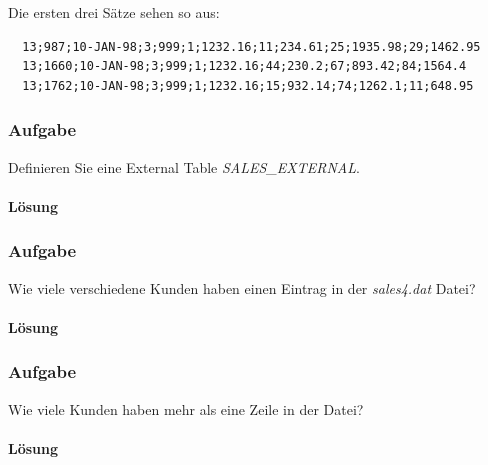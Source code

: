 Die ersten drei Sätze sehen so aus:
\begin{verbatim}
  13;987;10-JAN-98;3;999;1;1232.16;11;234.61;25;1935.98;29;1462.95
  13;1660;10-JAN-98;3;999;1;1232.16;44;230.2;67;893.42;84;1564.4
  13;1762;10-JAN-98;3;999;1;1232.16;15;932.14;74;1262.1;11;648.95
\end{verbatim}


\subsubsection{Aufgabe}
\label{subsec:uebung_12.aufgabe_01a}
Definieren Sie eine External Table \textit{SALES\_EXTERNAL}.

\paragraph{Lösung}
\label{subsubsec:uebung_12.aufgabe_01a.loesung}


\subsubsection{Aufgabe}
\label{subsec:uebung_12.aufgabe_01b}
Wie viele verschiedene Kunden haben einen Eintrag in der \textit{sales4.dat} Datei?

\paragraph{Lösung}
\label{subsubsec:uebung_12.aufgabe_01b.loesung}


\subsubsection{Aufgabe}
\label{subsec:uebung_12.aufgabe_01c}
Wie viele Kunden haben mehr als eine Zeile in der Datei?

\paragraph{Lösung}
\label{subsubsec:uebung_12.aufgabe_01c.loesung}


